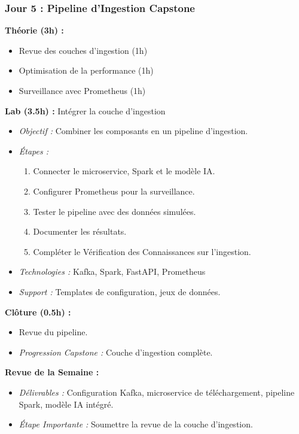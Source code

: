 \documentclass[11pt]{article}
\begin{document}
\subsubsection{Jour 5 : Pipeline d'Ingestion Capstone}
\textbf{Théorie (3h) :}
\begin{itemize}
    \item Revue des couches d'ingestion (1h)
    \item Optimisation de la performance (1h)
    \item Surveillance avec Prometheus (1h)
\end{itemize}
\textbf{Lab (3.5h) :} Intégrer la couche d'ingestion
\begin{itemize}
    \item \textit{Objectif :} Combiner les composants en un pipeline d'ingestion.
    \item \textit{Étapes :}
        \begin{enumerate}
            \item Connecter le microservice, Spark et le modèle IA.
            \item Configurer Prometheus pour la surveillance.
            \item Tester le pipeline avec des données simulées.
            \item Documenter les résultats.
            \item Compléter le Vérification des Connaissances sur l'ingestion.
        \end{enumerate}
    \item \textit{Technologies :} Kafka, Spark, FastAPI, Prometheus
    \item \textit{Support :} Templates de configuration, jeux de données.
\end{itemize}
\textbf{Clôture (0.5h) :}
\begin{itemize}
    \item Revue du pipeline.
    \item \textit{Progression Capstone :} Couche d'ingestion complète.
\end{itemize}

\textbf{Revue de la Semaine :}
\begin{itemize}
    \item \textit{Délivrables :} Configuration Kafka, microservice de téléchargement, pipeline Spark, modèle IA intégré.
    \item \textit{Étape Importante :} Soumettre la revue de la couche d'ingestion.
\end{itemize}
\end{document}
